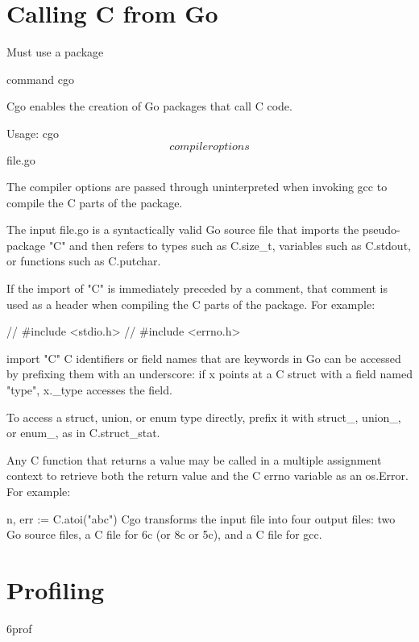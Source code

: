 
\section{Calling C from Go}

Must use a package

command cgo

Cgo enables the creation of Go packages that call C code.

Usage: cgo \[compiler options\] file.go

The compiler options are passed through uninterpreted when invoking gcc to compile the C parts of the package.

The input file.go is a syntactically valid Go source file that imports
the pseudo-package "C" and then refers to types such as C.size\_t,
variables such as C.stdout, or functions such as C.putchar.

If the import of "C" is immediately preceded by a comment, that comment
is used as a header when compiling the C parts of the package. For
example:

\begin{display}
// #include <stdio.h>
// #include <errno.h>
\end{display}
import "C"
C identifiers or field names that are keywords in Go can be accessed by
prefixing them with an underscore: if x points at a C struct with a
field named "type", x.\_type accesses the field.

To access a struct, union, or enum type directly, prefix it with
struct\_, union\_, or enum\_, as in C.struct\_stat.

Any C function that returns a value may be called in a multiple
assignment context to retrieve both the return value and the C errno
variable as an os.Error. For example:

n, err := C.atoi("abc")
Cgo transforms the input file into four output files: two Go source
files, a C file for 6c (or 8c or 5c), and a C file for gcc.


\section{Profiling}
6prof
